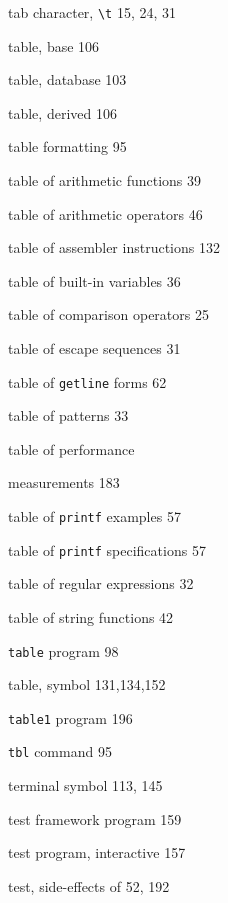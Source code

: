 \begin{multicols}{3}
\hangindent=3pc  tab character, \verb'\t' 15, 24, 31

\hangindent=3pc  table, base 106

\hangindent=3pc  table, database 103

\hangindent=3pc  table, derived 106

\hangindent=3pc  table formatting 95

\hangindent=3pc  table of arithmetic functions 39

\hangindent=3pc  table of arithmetic operators 46

\hangindent=3pc  table of assembler instructions 132

\hangindent=3pc  table of built-in variables 36

\hangindent=3pc  table of comparison operators 25

\hangindent=3pc  table of escape sequences 31

\hangindent=3pc  table of \verb'getline' forms 62

\hangindent=3pc  table of patterns 33

\hangindent=3pc  table of performance

\hangindent=3pc  measurements 183

\hangindent=3pc  table of \verb'printf' examples 57

\hangindent=3pc  table of \verb'printf' specifications 57

\hangindent=3pc  table of regular expressions 32

\hangindent=3pc  table of string functions 42

\hangindent=3pc  \verb'table' program 98

\hangindent=3pc  table, symbol 131,134,152

\hangindent=3pc  \verb'table1' program 196

\hangindent=3pc  \verb'tbl' command 95

\hangindent=3pc  terminal symbol 113, 145

\hangindent=3pc  test framework program 159

\hangindent=3pc  test program, interactive 157

\hangindent=3pc  test, side-effects of 52, 192


\end{multicols}
